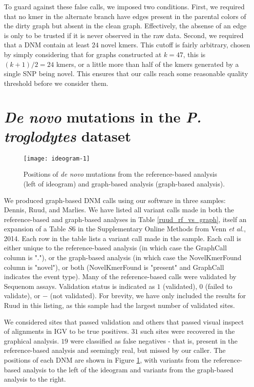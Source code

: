 To guard against these false calls, we imposed two conditions.  First, we required that no kmer in the alternate branch have edges present in the parental colors of the dirty graph but absent in the clean graph.  Effectively, the absense of an edge is only to be trusted if it is never observed in the raw data.  Second, we required that a DNM contain at least $24$ novel kmers.  This cutoff is fairly arbitrary, chosen by simply considering that for graphs constructed at $k=47$, this is $(k+1)/2 = 24$ kmers, or a little more than half of the kmers generated by a single SNP being novel.  This ensures that our calls reach some reasonable quality threshold before we consider them.

\section{\textit{De novo} mutations in the \textit{P. troglodytes} dataset}

\begin{figure}[h!]
  \centering
    \texttt{[image: ideogram-1]}
  \caption{Positions of \textit{de novo} mutations from the reference-based analysis (left of ideogram) and graph-based analysis (graph-based analysis).}
  \label{fig:ideogram-1}
\end{figure}

We produced graph-based DNM calls using our software in three samples: Dennis, Ruud, and Marlies.  We have listed all variant calls made in both the reference-based and graph-based analyses in Table \ref{ruud_rf_vs_graph}, itself an expansion of a Table $S6$ in the Supplementary Online Methods from Venn \textit{et al.}, 2014\cite{Venn:2014ep}.  Each row in the table lists a variant call made in the sample.  Each call is either unique to the reference-based analysis (in which case the GraphCall column is "."), or the graph-based analysis (in which case the NovelKmerFound column is "novel"), or both (NovelKmerFound is "present" and GraphCall indicates the event type).  Many of the reference-based calls were validated by Sequenom assays.  Validation status is indicated as $1$ (validated), $0$ (failed to validate), or $-$ (not validated).  For brevity, we have only included the results for Ruud in this listing, as this sample had the largest number of validated sites.

We considered sites that passed validation and others that passed visual inspect of alignments in IGV to be true positives.  $31$ such sites were recovered in the graphical analysis.  $19$ were classified as false negatives - that is, present in the reference-based analysis and seemingly real, but missed by our caller.  The positions of each DNM are shown in Figure \ref{fig:ideogram-1}, with variants from the reference-based analysis to the left of the ideogram and variants from the graph-based analysis to the right.

